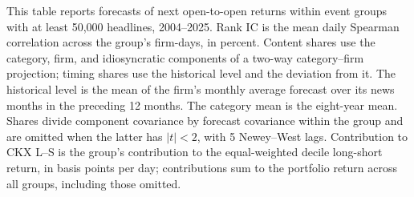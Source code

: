 \begin{table}[htbp]
\centering
\caption{Forecast Decomposition by Event Group}
\label{tab:tabA_groups}
\begin{minipage}{\linewidth}\footnotesize
This table reports forecasts of next open-to-open returns within event groups with at least 50,000 headlines, 2004--2025. Rank IC is the mean daily Spearman correlation across the group's firm-days, in percent. Content shares use the category, firm, and idiosyncratic components of a two-way category--firm projection; timing shares use the historical level and the deviation from it. The historical level is the mean of the firm's monthly average forecast over its news months in the preceding 12 months. The category mean is the eight-year mean. Shares divide component covariance by forecast covariance within the group and are omitted when the latter has $|t|<2$, with 5 Newey--West lags. Contribution to CKX L--S is the group's contribution to the equal-weighted decile long-short return, in basis points per day; contributions sum to the portfolio return across all groups, including those omitted.
\end{minipage}
\medskip


\end{table}
